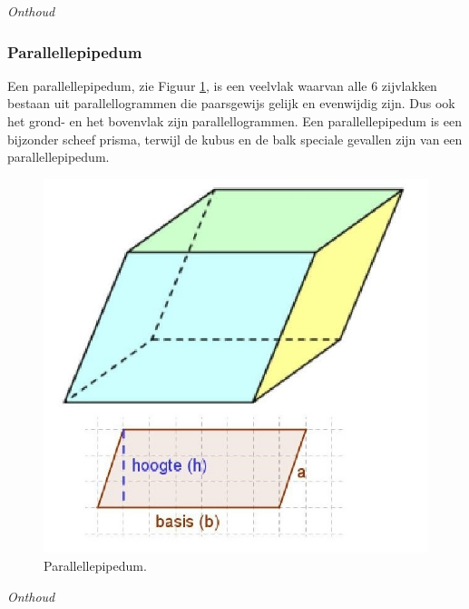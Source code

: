 \emph{Onthoud}



\subsubsection{Parallellepipedum}
Een parallellepipedum, zie Figuur \ref{fig:ruimtefigurenoppinhoudparallellepipedum}, is een veelvlak waarvan alle 6 zijvlakken bestaan uit parallellogrammen die paarsgewijs gelijk en evenwijdig zijn. Dus ook het grond- en het bovenvlak zijn parallellogrammen. Een parallellepipedum is een bijzonder scheef prisma, terwijl de kubus en de balk speciale gevallen zijn van een parallellepipedum.

\begin{figure}
	\centering
	\includegraphics[width=0.7\linewidth]{4_opp_inhoud_an_meetk/inputs/RuimteFigurenOppInhoud_parallellepipedum}
	\caption{Parallellepipedum.}
	\label{fig:ruimtefigurenoppinhoudparallellepipedum}
\end{figure}


\emph{Onthoud}


